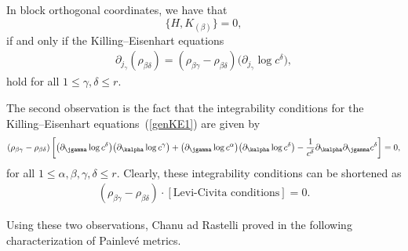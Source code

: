 \begin{Proposition}In block orthogonal coordinates, we have that
\[
 \big\{H,K_{(\beta)} \big\} = 0,
\]	
if and only if the Killing--Eisenhart equations
\begin{gather}\label{genKE1}
 \partial_{j_{\gamma}}(\rho_{ \beta \delta})= (\rho_{\beta \gamma} - \rho_{\beta \delta }) \big(\partial_{j_{\gamma}} \log c^\delta\big),
\end{gather}
hold for all $1 \leq \gamma, \delta \leq r$.
\end{Proposition}

The second observation is the fact that the integrability conditions for the Killing--Eisenhart equations~(\ref{genKE1}) are given by
\begin{gather*} %
 (\rho_{\beta \gamma} - \rho_{\beta \delta}) \left[ \big( \partial_{\jgamma} \log c^{\delta} \big) \big( \partial_{\kalpha} \log c^{\gamma}\big) + \big(\partial_{\jgamma} \log c^{\alpha} \big) \big( \partial_{\kalpha} \log c^{\delta} \big) - \frac{1}{c^{\delta}} \partial_{\kalpha}\partial_{\jgamma}c^{\delta} \right] = 0,
\end{gather*}
for all $1 \leq \alpha, \beta, \gamma, \delta \leq r$. Clearly, these integrability conditions can be shortened as
\begin{gather} \label{IC2}
 (\rho_{\beta \gamma} - \rho_{\beta \delta}) \cdot \left[ \textrm{Levi-Civita conditions} \right] = 0.
\end{gather}

Using these two observations, Chanu ad Rastelli proved in \cite[Proposition 5.5]{CR2019} the following characterization of Painlev\'e metrics.

